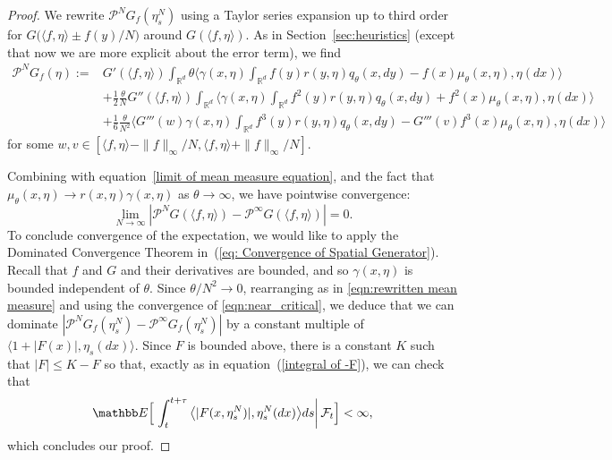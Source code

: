 \documentclass[EJP]{ejpecp} %
\newcommand{\IE}{\mathbb E}
\newcommand{\IR}{\mathbb R}
\newcommand{\Pgen}{\mathcal{P}}    %
\begin{document}
\begin{proof}
We rewrite $\Pgen^NG_f(\eta^N_s)$ using a 
Taylor series expansion up to third order for
$G\big(\langle f,\eta\rangle\pm f(y)/N\big)$ around
$G(\langle f, \eta \rangle )$.
As in Section~\ref{sec:heuristics} (except that now we are more explicit about
the error term), we find
\begin{equation} 
    \label{eq: Pre-Limit Generator Expanded}
\begin{aligned}
\Pgen^{N} G_f(\eta)
    :=& 
    G'(\langle f, \eta \rangle)\int_{\IR^d}  
\theta\Big\langle \gamma(x,\eta) \int_{\IR^d} f(y)r(y,\eta) q_{\theta}(x,dy) 
    - f(x)\mu_\theta(x,\eta), \eta(dx)\Big\rangle\\
&+\frac{1}{2}\frac{\theta}{N}G''(\langle f, \eta \rangle)\int_{\IR^d} 
 \Big\langle\gamma(x, \eta)\int_{\IR^d} f^2(y) r(y,\eta)q_{\theta}(x,dy)+f^2(x)
\mu_\theta(x, \eta), \eta(dx)\Big\rangle\\
&+\frac{1}{6}\frac{\theta}{N^2}\Big\langle
G'''(w) \gamma(x, \eta)\int_{\IR^d} f^3(y) r(y,\eta) 
q_{\theta}(x,dy)
-G'''(v)f^3(x)\mu_\theta(x, \eta), \eta(dx)\Big\rangle
\end{aligned}    
\end{equation}
for some $w,v \in [\langle f,\eta \rangle - \|f\|_\infty/N, 
\langle f,\eta \rangle + \|f\|_\infty/N]$.

Combining with equation~\eqref{limit of mean measure equation}, and the fact
that $\mu_\theta(x,\eta) \to r(x,\eta)\gamma(x,\eta)$ as $\theta\to\infty$, we have
pointwise convergence:
\begin{equation}
\lim_{N\to \infty} |\mathcal{P}^{N}G(\langle f, \eta \rangle) 
- \mathcal{P}^{\infty}G(\langle f, \eta \rangle)| = 0 .
\end{equation}
To conclude convergence of the expectation, 
we would like to apply the Dominated Convergence 
Theorem in~(\ref{eq: Convergence of Spatial Generator}).
Recall that $f$ and $G$ and their derivatives are bounded,
and so $\gamma(x,\eta)$ is bounded independent of $\theta$.
Since $\theta/N^2 \to 0$,
rearranging as in \eqref{eqn:rewritten mean measure}
and using the convergence of \eqref{eqn:near_critical},
we deduce that we can dominate
$\left| \Pgen^{N}G_f(\eta^{N}_s) -\Pgen^{\infty}G_f(\eta^{N}_s) \right|$
by a constant multiple of $\langle 1+|F(x)|,\eta_s(dx)\rangle$.
Since $F$ is bounded above, there is a constant $K$ such that $|F|\leq K-F$ so
that, exactly as in equation~(\ref{integral of -F}), 
we can check that
\[
\IE\Big[\left.\int_t^{t+\tau}\big\langle |F(x,\eta^N_s)|,\eta^N_s(dx)\big\rangle ds
\right| {\cal F}_t\Big]<\infty,
\]
which concludes our proof.
\end{proof}
\end{document}
